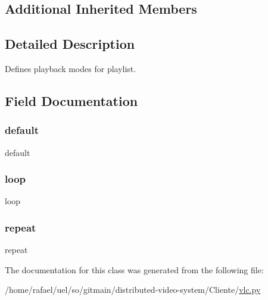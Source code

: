 \subsection*{Additional Inherited Members}


\subsection{Detailed Description}
\begin{DoxyVerb}Defines playback modes for playlist.
\end{DoxyVerb}
 

\subsection{Field Documentation}
\mbox{\label{classvlc_1_1_playback_mode_affb1327b18bf08a379d19eef89cf1ed1}} 
\subsubsection{\texorpdfstring{default}{default}}
{\footnotesize\ttfamily default\hspace{0.3cm}{\ttfamily [static]}}

\mbox{\label{classvlc_1_1_playback_mode_a56ab5fad99f595218aae18d1b7cce0d2}} 
\subsubsection{\texorpdfstring{loop}{loop}}
{\footnotesize\ttfamily loop\hspace{0.3cm}{\ttfamily [static]}}

\mbox{\label{classvlc_1_1_playback_mode_ac00f64e7ae9c4cbe2575af8554c4401d}} 
\subsubsection{\texorpdfstring{repeat}{repeat}}
{\footnotesize\ttfamily repeat\hspace{0.3cm}{\ttfamily [static]}}



The documentation for this class was generated from the following file\+:\begin{DoxyCompactItemize}
\item 
/home/rafael/uel/so/gitmain/distributed-\/video-\/system/\+Cliente/\hyperlink{vlc_8py}{vlc.\+py}\end{DoxyCompactItemize}
